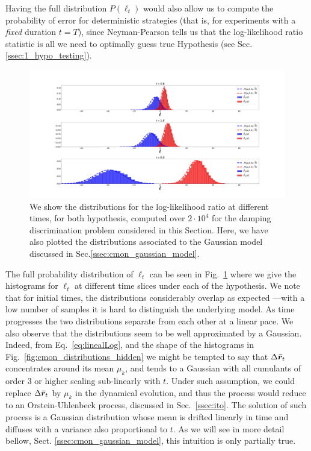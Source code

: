Having the full distribution $P(\ell_{t})$ would also allow us to compute the probability of error for deterministic strategies (that is, for experiments with a \emph{fixed} duration $t=T$), since Neyman-Pearson tells us that the log-likelihood ratio statistic is all we need to optimally guess true Hypothesis (see Sec.\ref{ssec:1_hypo_testing}).

\begin{figure}[t!]
    \centering
    \includegraphics[width=1.\textwidth]{Figures/CMON/damp-discri/temp/histograms_10K.pdf}
    \caption{We show the distributions for the log-likelihood ratio at different times, for both hypothesis, computed over $2\cdot 10^{4}$ for the damping discrimination problem considered in this Section. Here, we have also plotted the distributions associated to the Gaussian model discussed in Sec.\ref{ssec:cmon_gaussian_model}.}
    \label{fig:histoell}
\end{figure}

The full probability distribution of $\ell_{t}$  can be seen in Fig.~\ref{fig:histoell}
where we give the histograms for $\ell_{t}$ at different time slices under each of the hypothesis. We note that for initial times, the distributions considerably overlap as expected ---with a low number of samples it is hard to distinguish the underlying model. As time progresses the two distributions separate from each other at a linear pace. We also observe that the distributions seem to be well approximated by a Gaussian. Indeed, from Eq.~\ref{eq:linealLog}, and the shape of the histograms in Fig.~\ref{fig:cmon_distributions_hidden} we might be tempted to say that $\Delta \bm{\bar{r}}_t$ concentrates around its mean $\mu_k$, and tends to a Gaussian with all cumulants of order 3 or higher scaling sub-linearly with $t$. Under such assumption, we could replace $\Delta \bm{\bar{r}}_t$ by $\mu_k$ in the dynamical evolution, and thus the process would reduce to an Orstein-Uhlenbeck process, discussed in Sec.~\ref{ssec:ito}. The solution of such process is a Gaussian distribution whose mean is drifted linearly in time and diffuses with a variance also proportional to $t$. As we will see in more detail bellow,
Sect. \ref{ssec:cmon_gaussian_model}, this intuition is only partially true.

